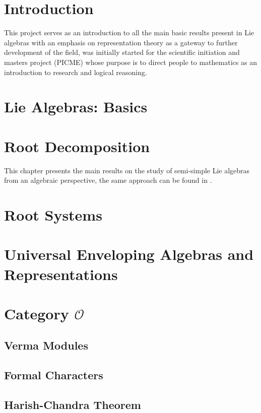 \documentclass[svgnames,12pt,oneside, openright,a4paper]{scrbook}
\newcommand{\bggO}{\mathcal{O}}
\begin{document}

 \tableofcontents
\chapter*{Introduction}
This project serves as an introduction to all the main basic results present in Lie algebras with an emphasis on representation theory as a gateway to further development of the field, was initially started for the scientific initiation and masters project (PICME) whose purpose is to direct people to mathematics as an introduction to research and logical reasoning.
\chapter{Lie Algebras: Basics}






\chapter{Root Decomposition}
This chapter presents the main results on the study of semi-simple Lie algebras from an algebraic perspective, the same approach can be found in \cite{humphreys1}.




\chapter{Root Systems}



\chapter{Universal Enveloping Algebras and Representations}


\chapter{Category $\bggO$}

\section{Verma Modules}
\section{Formal Characters}
\section{Harish-Chandra Theorem}
\end{document}
